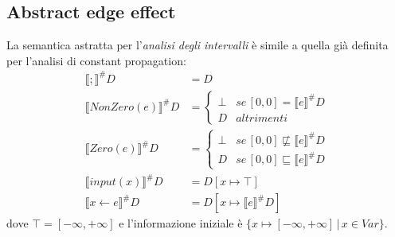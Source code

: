 \documentclass[a4paper,oneside,titlepage]{book}
\begin{document}
\subsection{Abstract edge effect}
\label{int2}
La semantica astratta per l'\textit{analisi degli intervalli} è simile a quella già definita per l'analisi di constant propagation:
\begin{align*}
	\llbracket ; \rrbracket^\# D &= D \\
	\llbracket NonZero(e) \rrbracket^\# D &=
	\begin{cases}
		\bot & se \, [0,0] = \llbracket e \rrbracket^\# D \\
		D & altrimenti
	\end{cases} \\
	\llbracket Zero(e) \rrbracket^\# D &=
	\begin{cases}
	    \bot & se \, [0,0] \not\sqsubseteq \llbracket e \rrbracket^\# D \\
		D & se \, [0,0] \sqsubseteq \llbracket e \rrbracket^\# D
	\end{cases} \\
	\llbracket input(x) \rrbracket^\# D &= D[x \mapsto \top] \\
	\llbracket x \leftarrow e \rrbracket^\# D &= D[x \mapsto \llbracket e \rrbracket^\# D]
\end{align*}
dove $\top = [- \infty, + \infty]$ e l'informazione iniziale è $\{ x \mapsto [- \infty, + \infty] \, | \, x \in Var \}$.
\end{document}
